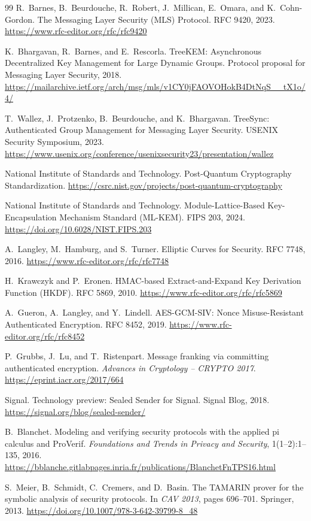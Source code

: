 \documentclass[preprint,12pt]{elsarticle}
\theoremstyle{definition}
\begin{document}
\begin{thebibliography}{99}
R.~Barnes, B.~Beurdouche, R.~Robert, J.~Millican, E.~Omara, and K.~Cohn-Gordon.
\newblock The Messaging Layer Security (MLS) Protocol.
\newblock RFC 9420, 2023.
\newblock \url{https://www.rfc-editor.org/rfc/rfc9420}

K.~Bhargavan, R.~Barnes, and E.~Rescorla.
\newblock TreeKEM: Asynchronous Decentralized Key Management for Large Dynamic
Groups.
\newblock Protocol proposal for Messaging Layer Security, 2018.
\newblock \url{https://mailarchive.ietf.org/arch/msg/mls/v1CY0jFAOVOHokB4DtNqS__tX1o/4/}

T.~Wallez, J.~Protzenko, B.~Beurdouche, and K.~Bhargavan.
\newblock TreeSync: Authenticated Group Management for Messaging Layer Security.
\newblock USENIX Security Symposium, 2023.
\newblock \url{https://www.usenix.org/conference/usenixsecurity23/presentation/wallez}

National Institute of Standards and Technology.
\newblock Post-Quantum Cryptography Standardization.
\newblock \url{https://csrc.nist.gov/projects/post-quantum-cryptography}

National Institute of Standards and Technology.
\newblock Module-Lattice-Based Key-Encapsulation Mechanism Standard (ML-KEM).
\newblock FIPS 203, 2024.
\newblock \url{https://doi.org/10.6028/NIST.FIPS.203}

A.~Langley, M.~Hamburg, and S.~Turner.
\newblock Elliptic Curves for Security.
\newblock RFC 7748, 2016.
\newblock \url{https://www.rfc-editor.org/rfc/rfc7748}

H.~Krawczyk and P.~Eronen.
\newblock HMAC-based Extract-and-Expand Key Derivation Function (HKDF).
\newblock RFC 5869, 2010.
\newblock \url{https://www.rfc-editor.org/rfc/rfc5869}

A.~Gueron, A.~Langley, and Y.~Lindell.
\newblock AES-GCM-SIV: Nonce Misuse-Resistant Authenticated Encryption.
\newblock RFC 8452, 2019.
\newblock \url{https://www.rfc-editor.org/rfc/rfc8452}

P.~Grubbs, J.~Lu, and T.~Ristenpart.
\newblock Message franking via committing authenticated encryption.
\newblock \emph{Advances in Cryptology -- CRYPTO 2017}.
\newblock \url{https://eprint.iacr.org/2017/664}

Signal.
\newblock Technology preview: Sealed Sender for Signal.
\newblock Signal Blog, 2018.
\newblock \url{https://signal.org/blog/sealed-sender/}

B.~Blanchet.
\newblock Modeling and verifying security protocols with the applied pi calculus
and {ProVerif}.
\newblock \emph{Foundations and Trends in Privacy and Security},
1(1--2):1--135, 2016.
\newblock \url{https://bblanche.gitlabpages.inria.fr/publications/BlanchetFnTPS16.html}

S.~Meier, B.~Schmidt, C.~Cremers, and D.~Basin.
\newblock The {TAMARIN} prover for the symbolic analysis of security protocols.
\newblock In \emph{CAV 2013}, pages 696--701. Springer, 2013.
\newblock \url{https://doi.org/10.1007/978-3-642-39799-8_48}

\end{thebibliography}
\end{document}
